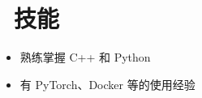 \section{\faCogs\ 技能}
\begin{itemize}
	\item 熟练掌握 C++ 和 Python
	\item 有 PyTorch、Docker 等的使用经验
\end{itemize}
